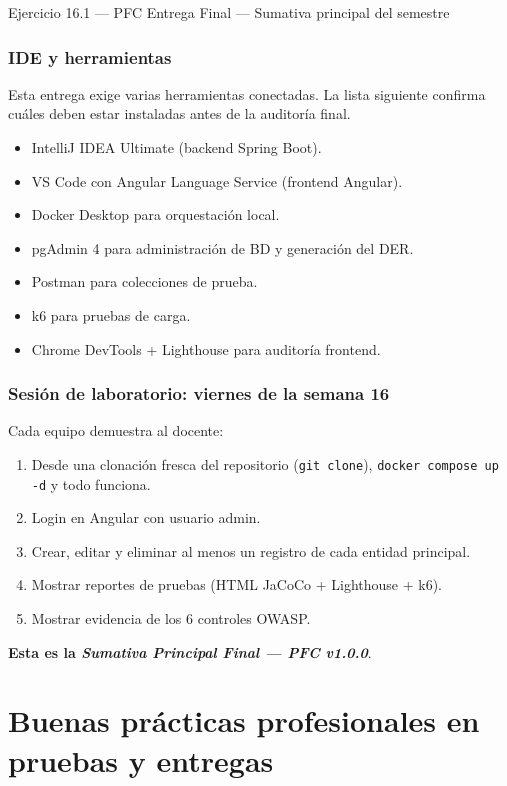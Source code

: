 \begin{cajaejercicio}{Ejercicio 16.1 --- PFC Entrega Final --- Sumativa principal del semestre}
\subsubsection*{IDE y herramientas}

Esta entrega exige varias herramientas conectadas. La lista
siguiente confirma cuáles deben estar instaladas antes de la
auditoría final.


\begin{itemize}
\item IntelliJ IDEA Ultimate (backend Spring Boot).
\item VS Code con Angular Language Service (frontend Angular).
\item Docker Desktop para orquestación local.
\item pgAdmin 4 para administración de BD y generación del DER.
\item Postman para colecciones de prueba.
\item k6 para pruebas de carga.
\item Chrome DevTools + Lighthouse para auditoría frontend.
\end{itemize}

\subsubsection*{Sesión de laboratorio: viernes de la semana 16}

Cada equipo demuestra al docente:
\begin{enumerate}
\item Desde una clonación fresca del repositorio
(\texttt{git clone}), \texttt{docker compose up -d} y todo
funciona.
\item Login en Angular con usuario admin.
\item Crear, editar y eliminar al menos un registro de cada entidad
principal.
\item Mostrar reportes de pruebas (HTML JaCoCo + Lighthouse + k6).
\item Mostrar evidencia de los 6 controles OWASP.
\end{enumerate}

\textbf{Esta es la \emph{Sumativa Principal Final --- PFC v1.0.0}}.
\end{cajaejercicio}

\section{Buenas prácticas profesionales en pruebas y entregas}

